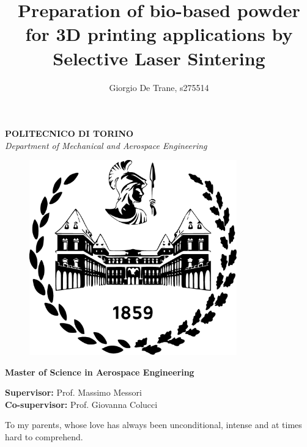 \documentclass{article}
\author{Giorgio De Trane, s275514}
\title{\textbf{Preparation of bio-based powder for 3D printing applications by Selective Laser Sintering}}
\begin{document}
    \setlength{\parindent}{0pt}

    \maketitle
    \begin{center}
        \textbf{POLITECNICO DI TORINO} \\ 
        \textit{Department of Mechanical and Aerospace Engineering} \\
    \end{center}

    \begin{figure}[ht]
        \centering
        \includegraphics[width=0.8\textwidth]{Pictures/polito_logo.eps}  
        \label{fig:polito_logo}      
    \end{figure}

    \begin{center} 
        \textbf{Master of Science in Aerospace Engineering} \\
    \end{center}


    \begin{center}
        \textbf{Supervisor:} Prof. Massimo Messori \\
        \textbf{Co-supervisor:} Prof. Giovanna Colucci \\
    \end{center}



    \newpage
    \begin{center}
        To my parents, whose love has always been unconditional, intense and at times hard to comprehend. 
    \end{center}
    \newpage
\end{document}
